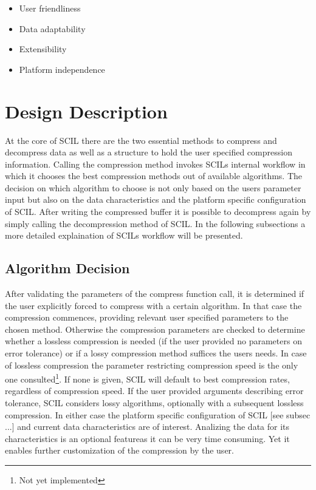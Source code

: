 \documentclass[
	12pt,
	a4paper,
	BCOR10mm,
	DIV14,
	headsepline,
]{scrreprt}
\begin{document}
\bigskip

\begin{itemize}
	\item User friendliness
	\item Data adaptability
	\item Extensibility
	\item Platform independence
\end{itemize}

\bigskip

\clearpage

\section{Design Description}

\bigskip

At the core of SCIL there are the two essential methods to compress and
decompress data as well as a structure to hold the user specified compression
information. Calling the compression method invokes SCILs internal workflow in
which it chooses the best compression methods out of available algorithms.
The decision on which algorithm to choose is not only based on the users
parameter input but also on the data characteristics and the platform specific
configuration of SCIL. After writing the compressed buffer it is possible to
decompress again by simply calling the decompression method of SCIL.
In the following subsections a more detailed explaination of SCILs workflow
will be presented.

\bigskip

\subsection{Algorithm Decision}

\bigskip

After validating the parameters of the compress function call, it is determined
if the user explicitly forced to compress with a certain algorithm. In that case
the compression commences, providing relevant user specified parameters to the
chosen method. Otherwise the compression parameters are checked to determine
whether a lossless compression is needed (if the user provided no parameters on
error tolerance) or if a lossy compression method suffices the users needs. In
case of lossless compression the parameter restricting compression speed is
the only one consulted\footnote{Not yet implemented}. If none is given, SCIL
will default to best compression rates, regardless of compression speed. If the
user provided arguments describing error tolerance, SCIL considers lossy
algorithms, optionally with a subsequent lossless
compression\footnotemark[\value{footnote}]. In either case the platform specific
configuration of SCIL [see subsec ...] and current data characteristics are of
interest. Analizing the data for its characteristics is an optional
feature\footnotemark[\value{footnote}] as it can be very time consuming. Yet it
enables further customization of the compression by the user.
\end{document}
